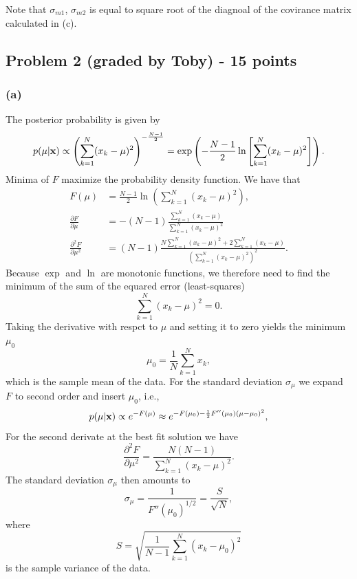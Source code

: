 \documentclass[11pt]{article}
\begin{document}
Note that $\sigma_{m1}$, $\sigma_{m2}$ is equal to square root of the diagnoal of the covirance matrix calculated in (c). 


\clearpage
\subsection*{Problem 2 (graded by Toby) - 15 points}

\subsubsection*{(a)}
The posterior probability is given by
\begin{equation}
p(\mu|\mathbf{x}) \propto \left( \sum_{k=1}^N (x_k - \mu)^2 \right)^{-\frac{N-1}{2}} =\exp \left( -\frac{N-1}{2} \ln \left[ \sum_{k=1}^N (x_k - \mu)^2 \right] \right).
\end{equation}
Minima of $F$ maximize the probability density function. We have that
\begin{subequations}
\begin{align}
F(\mu) &= \frac{N-1}{2} \ln \left( \sum_{k=1}^N (x_k-\mu)^2 \right), \\
\frac{\partial F}{\partial \mu} &= -(N-1) \frac{\sum_{k=1}^N(x_k - \mu)}{\sum_{k=1}^N(x_k - \mu)^2}\\
\frac{\partial^2 F}{\partial \mu^2} &= (N-1) \frac{N\sum_{k=1}^N(x_k - \mu)^2+2\sum_{k=1}^N(x_k - \mu)}{\left(\sum_{k=1}^N(x_k - \mu)^2\right)^2}.
\end{align}
\end{subequations}
Because $\exp$ and $\ln$ are monotonic functions, we therefore need to find the minimum of the sum of the equared error (least-squares)
\begin{equation}
\sum_{k=1}^N (x_k - \mu)^2 = 0.
\end{equation}
Taking the derivative with respct to $\mu$ and setting it to zero yields the minimum $\mu_0$
\begin{equation}
\mu_0 = \frac{1}{N} \sum_{k=1}^N x_k, 
\end{equation}
which is the sample mean of the data. For the standard deviation $\sigma_\mu$ we expand $F$ to second order and insert $\mu_0$, i.e., 
\begin{equation}
p(\mu|\mathbf{x}) \propto e^{-F(\mu)} \approx e^{-F(\mu_0) - \frac{1}{2}F''(\mu_0)(\mu - \mu_0)^2}, 
\end{equation}
For the second derivate at the best fit solution we have
\begin{equation}
\frac{\partial^2 F}{\partial \mu^2} = \frac{N(N-1)}{\sum_{k=1}^N(x_k - \mu)^2}.
\end{equation}
The standard deviation $\sigma_\mu$ then amounts to
\begin{equation}
\sigma_\mu = \frac{1}{F''(\mu_0)^{1/2}} = \frac{S}{\sqrt{N}}, 
\end{equation}
where 
\begin{equation}
S = \sqrt{\frac{1}{N-1} \sum_{k=1}^N (x_k - \mu_0)^2 }
\end{equation}
is the sample variance of the data.
\end{document}
